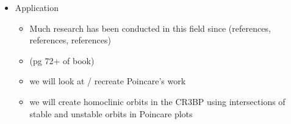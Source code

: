 \documentclass{article}
\begin{document}
\begin{itemize}
\begin{itemize}
	  \end{itemize}
	\item Application
	  \begin{itemize}
	  	\item \color{red}Much research has been conducted in this field since (references, references, references)\color{black}
	  	\item (pg 72+ of book)
	  	\item we will look at / recreate Poincare's work
	  	\item we will create homoclinic orbits in the CR3BP using intersections of stable and unstable orbits in Poincare plots
	  \end{itemize}
\end{itemize}
\end{document}
